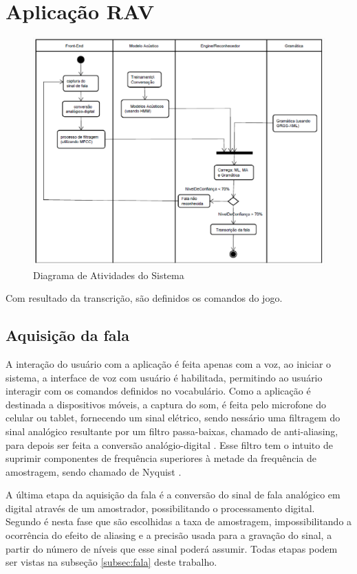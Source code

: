 \section{Aplicação RAV}
\begin{figure}[H]
\includegraphics[width=1\textwidth]{graficos/desenvolvimento_rav.eps}
\caption{Diagrama de Atividades do Sistema}
\end{figure}

Com resultado da transcrição, são definidos os comandos do jogo.

\subsection{Aquisição da fala}

A interação do usuário com a aplicação é feita apenas com a voz, ao iniciar o sistema, a interface de voz com usuário é habilitada, permitindo ao usuário interagir com os comandos definidos no vocabulário. Como a aplicação é destinada a dispositivos móveis, a captura do som, é feita pelo microfone do celular ou tablet, fornecendo um sinal elétrico, sendo nessário uma filtragem do sinal analógico resultante por um filtro passa-baixas, chamado de anti-aliasing, para depois ser feita a conversão analógio-digital \cite{DigitalProcRabiner}. Esse filtro tem o intuito de suprimir componentes de frequência superiores à metade da frequência de amostragem, sendo chamado de Nyquist \cite{DigitalSigProakis}.

A última etapa da aquisição da fala é a conversão do sinal de fala analógico em digital através de um
amostrador, possibilitando o processamento digital. Segundo  é nesta fase que são
escolhidas a taxa de amostragem, impossibilitando a ocorrência do efeito de aliasing e a precisão usada para a gravação do sinal, a partir do número de níveis que esse sinal poderá assumir. 
Todas etapas podem ser vistas na subseção \ref{subsec:fala} deste trabalho.


